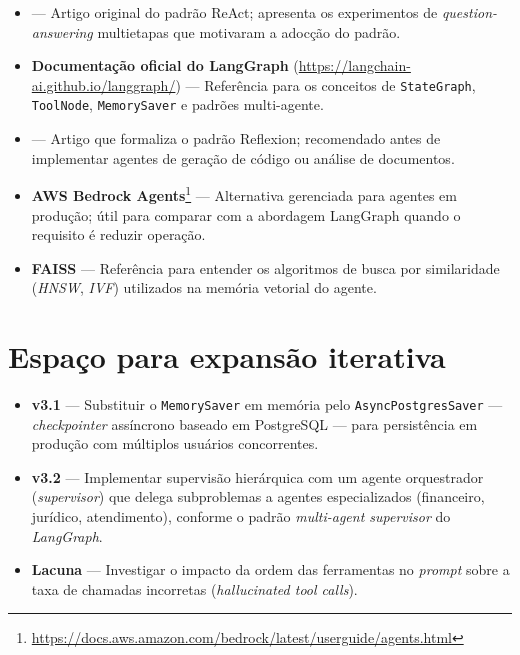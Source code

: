 \begin{itemize}[leftmargin=*]
  \item \textbf{} --- Artigo original do
        padr\~ao ReAct; apresenta os experimentos de
        \textit{question-answering} multietapas que motivaram a
        adoc\c{c}\~ao do padr\~ao.
  \item \textbf{Documenta\c{c}\~ao oficial do LangGraph}
        (\url{https://langchain-ai.github.io/langgraph/}) ---
        Refer\^encia para os conceitos de \texttt{StateGraph},
        \texttt{ToolNode}, \texttt{MemorySaver} e
        padr\~oes multi-agente.
  \item \textbf{} --- Artigo que
        formaliza o padr\~ao Reflexion; recomendado antes de
        implementar agentes de gera\c{c}\~ao de c\'odigo ou
        an\'alise de documentos.
  \item \textbf{AWS Bedrock Agents}\footnote{\url{https://docs.aws.amazon.com/bedrock/latest/userguide/agents.html}}
        --- Alternativa gerenciada para agentes em produ\c{c}\~ao;
        \'util para comparar com a abordagem LangGraph quando o
        requisito \'e reduzir opera\c{c}\~ao.
  \item \textbf{FAISS} \cite{johnson2019billion} --- Refer\^encia
        para entender os algoritmos de busca por similaridade
        (\textit{HNSW}, \textit{IVF}) utilizados na mem\'oria
        vetorial do agente.
\end{itemize}

\section{Espa\c{c}o para expans\~ao iterativa}

\begin{itemize}[leftmargin=*]
  \item \textbf{v3.1} --- Substituir o \texttt{MemorySaver} em
        mem\'oria pelo \texttt{AsyncPostgresSaver} ---
        \textit{checkpointer} ass\'incrono baseado em PostgreSQL ---
        para persist\^encia em produ\c{c}\~ao com m\'ultiplos
        usu\'arios concorrentes.
  \item \textbf{v3.2} --- Implementar supervis\~ao hier\'arquica com
        um agente orquestrador (\textit{supervisor}) que delega
        subproblemas a agentes especializados (financeiro, jur\'idico,
        atendimento), conforme o padr\~ao
        \textit{multi-agent supervisor} do \textit{LangGraph}.
  \item \textbf{Lacuna} --- Investigar o impacto da ordem das
        ferramentas no \textit{prompt} sobre a taxa de chamadas
        incorretas (\textit{hallucinated tool calls}).
\end{itemize}
